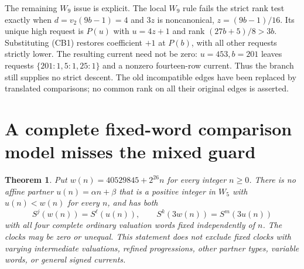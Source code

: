 \documentclass[11pt]{article}
\newtheorem{theorem}{Theorem}
\begin{document}
The remaining $W_9$ issue is explicit. The local $W_9$ rule fails the
strict rank test exactly when $d=v_2(9b-1)=4$ and
$3z$ is noncanonical, $z=(9b-1)/16$. Its unique high request is
$P(u)$ with $u=4z+1$ and rank $(27b+5)/8>3b$.
Substituting (CB1) restores coefficient $+1$ at $P(b)$, with all
other requests strictly lower. The resulting current need not be zero:
$u=453,b=201$ leaves requests $\{201:1,5:1,25:1\}$ and a nonzero
fourteen-row current. Thus the branch still supplies no strict descent.
The old incompatible edges have been replaced by translated comparisons;
no common rank on all their original edges is asserted.

\section{A complete fixed-word comparison model misses the mixed guard}
\begin{theorem}\label{thm:uniformpairscope}
Put $w(n)=40529845+2^{26}n$ for every integer $n\ge0$.
There is no affine partner $u(n)=\alpha n+\beta$ that is a positive
integer in $W_5$ with $u(n)<w(n)$ for every $n$, and has both
\[
 S^j(w(n))=S^\ell(u(n)),\qquad
 S^k(3w(n))=S^m(3u(n))
\]
with all four complete ordinary valuation words fixed independently of $n$.
The clocks may be zero or unequal. This statement does not exclude fixed
clocks with varying intermediate valuations, refined progressions, other
partner types, variable words, or general signed currents.
\end{theorem}
\end{document}
